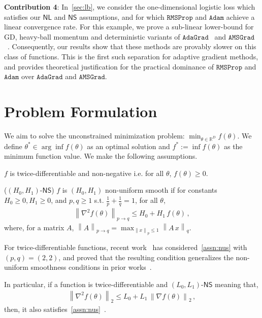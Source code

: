 \documentclass{article}
\newcommand{\norm}[1]{\left\|#1 \right\|}
\newcommand{\R}{\mathbb{R}}
\newcommand{\RMS}{\texttt{RMSProp}}
\newcommand{\Adam}{\texttt{Adam}}
\newcommand{\AdaGrad}{\texttt{AdaGrad}}
\newcommand{\AMSGrad}{\texttt{AMSGrad}}
\newcommand{\NS}{\textsf{NS}}
\newcommand{\NL}{\textsf{NL}}
\begin{document}
\textbf{Contribution 4}: In~\cref{sec:lb}, we consider the one-dimensional logistic loss which satisfies our $\NL$ and $\NS$ assumptions,  and for which $\RMS$ and $\Adam$ achieve a linear convergence rate. For this example, we prove a sub-linear lower-bound for GD, heavy-ball momentum and deterministic variants of $\AdaGrad$~\citep{duchi2011adaptive} and $\AMSGrad$~\citep{reddi2019convergence}. Consequently, our results show that these methods are provably slower on this class of functions. This is the first such separation  for adaptive gradient methods, and provides theoretical justification for the practical dominance of \(\RMS\) and \(\Adam\) over \(\AdaGrad\) and \(\AMSGrad\).
\section{Problem Formulation}
\label{sec:problem}
We aim to solve the unconstrained minimization problem: $\min_{\theta \in \R^D} f(\theta)$. We define $\theta^* \in \arg\inf f(\theta)$ as an optimal solution and $f^* := \inf f(\theta)$ as the minimum function value. We make the following assumptions. 
\begin{assumption}
$f$ is twice-differentiable and non-negative i.e. for all $\theta$, $f(\theta) \geq 0$. 
\label{assn:non-negative}
\end{assumption}

\begin{assumption}{($(H_0, H_1)$-$\NS$)}
$f$ is $(H_0, H_1)$ non-uniform smooth if for constants $H_0 \geq 0, H_1 \geq 0$, and $p, q \geq 1$ s.t. $\frac{1}{p} + \frac{1}{q} = 1$, for all $\theta$, 
\begin{align}
\norm{\nabla^2 f(\theta)}_{p \to q} \leq H_0 + H_1 \, f(\theta) \,,    
\label{eq:nus}
\end{align}
where, for a matrix $A$, $\norm{A}_{p \to q} = \max_{\norm{x}_p \leq 1} \norm{A \, x}_{q}$. 
\label{assn:nus}
\end{assumption}
For twice-differentiable functions, recent work~\citep{vaswani2025armijo,alimisis2025we} has considered~\cref{assn:nus} with $(p,q) = (2,2)$, and proved that the resulting condition generalizes the non-uniform smoothness conditions in prior works~\citep{zhang2019gradient, zhang2020improved}. 

In particular, if a function is twice-differentiable and $(L_0, L_1)$-$\NS$ meaning that,
\begin{align}
\norm{\nabla^2 f(\theta)}_{2} \leq L_0 + L_1 \, \norm{\nabla f(\theta)}_{2}    \,,
\label{eq:zhang-nus}
\end{align}
then, it also satisfies~\cref{assn:nus}~\citep[Prop. 3]{vaswani2025armijo}.
\end{document}
